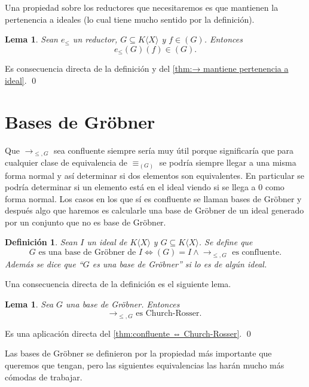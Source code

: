 \documentclass[12pt]{report}
\theoremstyle{customstyle}
\newtheorem{definition}[theorem]{Definición}
\newtheorem{lemma}[theorem]{Lema}
\renewenvironment{proof}[1][\proofname]{{\noindent \bfseries #1: }}{\qed} %
\theoremstyle{factstyle}
\begin{document}
Una propiedad sobre los reductores que necesitaremos es que mantienen la pertenencia a ideales (lo cual tiene mucho sentido por la definición).

\begin{lemma}\label{lemma:e mantiene pertenencia a ideal}
  Sean $e_≤$ un reductor, $G ⊆ K⟨X⟩$ y $f ∈ (G)$. Entonces
  \[ e_≤(G)(f) ∈ (G) \text{.}\]
\end{lemma}
\begin{proof}
  Es consecuencia directa de la definición y del \cref{thm:→ mantiene pertenencia a ideal}.
\end{proof}

\section{Bases de Gröbner}

Que $→_{≤, G}$ sea confluente siempre sería muy útil porque significaría que para cualquier clase de equivalencia de $≡_{(G)}$ se podría siempre llegar a una misma forma normal y así determinar si dos elementos son equivalentes. En particular se podría determinar si un elemento está en el ideal viendo si se llega a $0$ como forma normal. Los casos en los que sí es confluente se llaman bases de Gröbner y después algo que haremos es calcularle una base de Gröbner de un ideal generado por un conjunto que no es base de Gröbner.

\begin{definition}\label{def:base de Gröbner}
  Sean $I$ un ideal de $K⟨X⟩$ y $G ⊆ K⟨X⟩$. Se define que
  \[G\text{ es una base de Gröbner de }I ⇔ (G) = I ∧ →_{≤, G}\text{ es confluente} \text{.} \]
  Además se dice que ``$G$ es una base de Gröbner'' si lo es de algún ideal.
\end{definition}

Una consecuencia directa de la definición es el siguiente lema.

\begin{lemma}\label{lemma:→ gröbner es Church-Rosser}
  Sea $G$ una base de Gröbner. Entonces
  \[→_{≤, G}\text{ es Church-Rosser.}\]
\end{lemma}
\begin{proof}
  Es una aplicación directa del \cref{thm:confluente ⇔ Church-Rosser}.
\end{proof}

Las bases de Gröbner se definieron por la propiedad más importante que queremos que tengan, pero las siguientes equivalencias las harán mucho más cómodas de trabajar.
\end{document}
